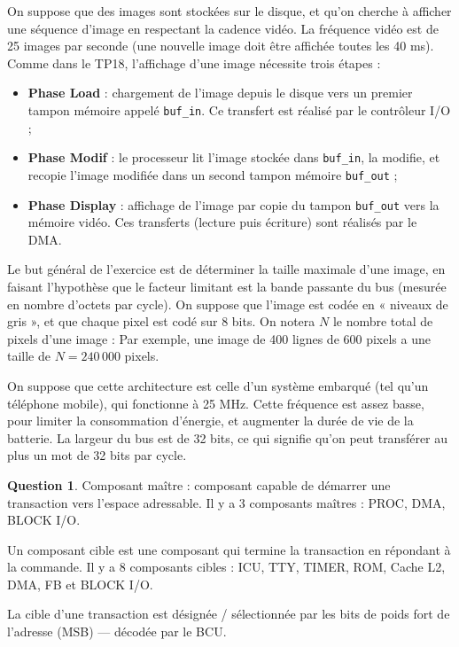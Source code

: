 \documentclass[11pt,english,french]{scrreprt}
\theoremstyle{remark}
\theoremstyle{definition}
\newtheorem{ques}{Question}[section]
\begin{document}
On suppose que des images sont stockées sur le disque, et qu’on cherche à afficher une séquence d’image en respectant la cadence vidéo. La fréquence vidéo est de 25 images par seconde (une nouvelle image doit être affichée toutes les 40 ms). Comme dans le TP18, l’affichage d’une image nécessite trois étapes :\begin{itemize}
	\item \textbf{Phase Load} : chargement de l’image depuis le disque vers un premier tampon mémoire appelé \lstinline!buf_in!. Ce transfert est réalisé par le contrôleur I/O ;
	\item \textbf{Phase Modif} : le processeur lit l’image stockée dans \lstinline!buf_in!, la modifie, et recopie l’image modifiée dans un second tampon mémoire \lstinline!buf_out! ;
	\item \textbf{Phase Display} : affichage de l’image par copie du tampon \lstinline!buf_out! vers la mémoire vidéo. Ces transferts (lecture puis écriture) sont réalisés par le DMA.
\end{itemize}

Le but général de l'exercice est de déterminer la taille maximale d'une image, en faisant l'hypothèse que le facteur limitant est la bande passante du bus (mesurée en nombre d'octets par cycle). On suppose que l'image est codée en « niveaux de gris », et que chaque pixel est codé sur 8 bits. On notera $N$ le nombre total de pixels d'une image : Par exemple, une image de 400 lignes de 600 pixels a une taille de $N = 240\,000$ pixels.

On suppose que cette architecture est celle d'un système embarqué (tel qu'un téléphone mobile), qui fonctionne à 25 MHz. Cette fréquence est assez basse, pour limiter la consommation d'énergie, et augmenter la durée de vie de la batterie. La largeur du bus est de 32 bits, ce qui signifie qu'on peut transférer au plus un mot de 32 bits par cycle.


\begin{ques}
	Composant maître : composant capable de démarrer une transaction vers l'espace adressable. Il y a 3 composants maîtres : PROC, DMA, BLOCK I/O.
	
	Un composant cible est une composant qui termine la transaction en répondant à la commande. Il y a 8 composants cibles : ICU, TTY, TIMER, ROM, Cache L2, DMA, FB et BLOCK I/O.
	
	La cible d'une transaction est désignée / sélectionnée par les bits de poids fort de l'adresse (MSB) --- décodée par le BCU.
\end{ques}
\end{document}
